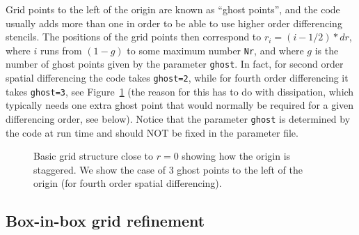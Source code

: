 \documentclass[12pt]{article}
\begin{document}
Grid points to the left of the origin are known as ``ghost points'',
and the code usually adds more than one in order to be able to use
higher order differencing stencils. The positions of the grid points
then correspond to $r_i = (i-1/2)*dr$, where $i$ runs from $(1-g)$ to
some maximum number \texttt{Nr}, and where $g$ is the number of ghost
points given by the parameter \texttt{ghost}.  In fact, for second
order spatial differencing the code takes \texttt{ghost=2}, while for
fourth order differencing it takes \texttt{ghost=3}, see
Figure~\ref{fig:grid} (the reason for this has to do with dissipation,
which typically needs one extra ghost point that would normally be
required for a given differencing order, see below). Notice that the
parameter \texttt{ghost} is determined by the code at run time and
should NOT be fixed in the parameter file. \\

\begin{figure}[t]
\begin{center}
\end{center}
\caption{Basic grid structure close to $r=0$ showing how the origin is
  staggered.  We show the case of 3 ghost points to the left of the
  origin (for fourth order spatial differencing).}
\label{fig:grid}
\end{figure}


\subsection{Box-in-box grid refinement}
\end{document}
